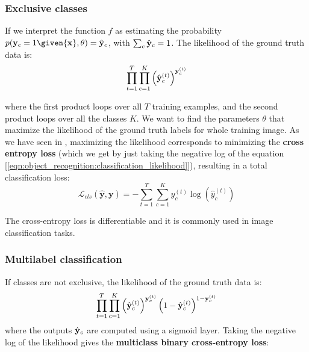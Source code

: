 \subsubsection{Exclusive classes}

If we interpret the function $f$ as estimating the probability $p({\bf y}_c=1 \given {\bf x}, \theta) = \hat {\bf y}_c$, with $\sum_c \hat {\bf y}_c =1$. The likelihood of the ground truth data is:
\begin{equation}
\prod_{t=1}^T \prod_{c=1}^K \left( \hat {\bf y}^{(t)}_c \right) ^{{\bf y}^{(t)}_c}\label{eqn:object_recognition:classification_likelihood}
\end{equation}


where the first product loops over all $T$ training examples, and the second product loops over all the classes $K$. We want to find the parameters $\theta$ that maximize the likelihood of the ground truth labels for whole training image. As we have seen in \chap{\ref{chapter:convolutional_neural_nets}}, maximizing the likelihood corresponds to minimizing the {\bf cross entropy loss} (which we get by just taking the negative log of the  equation [\ref{eqn:object_recognition:classification_likelihood}]), resulting in a total classification loss:
\begin{equation}
    \mathcal{L}_{cls}(\hat{\mathbf{y}},\mathbf{y})
     = -\sum_{t=1}^{T} \sum_{c=1}^{K} y^{(t)}_c \log(\hat{y}^{(t)}_c)
\end{equation}

The cross-entropy loss is differentiable and it is commonly used in image classification tasks. 

\subsubsection{Multilabel classification}

If classes are not exclusive, the likelihood of the ground truth data is:
\begin{equation}
\prod_{t=1}^T \prod_{c=1}^K \left( \hat {\bf y}^{(t)}_c \right) ^{{\bf y}^{(t)}_c}
\left( 1-\hat {\bf y}^{(t)}_c \right) ^{1-{\bf y}^{(t)}_c}
\end{equation}
where the outputs $\hat {\bf y}_c$ are computed using a sigmoid layer.  Taking the negative log of the likelihood gives the {\bf multiclass binary cross-entropy loss}:


